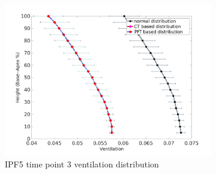 \begin{figure}[htbp]  
\centering
\begin{subfigure}{.6\linewidth}%
  \includegraphics[width=\linewidth,trim={{.0\wd0} {.0\wd0} {.0\wd0} {.0\wd0}},clip]{Appendix/Image_AppexB/IPF513/IPF513_VentilationAgainstLungHeight.png} %
  \caption{IPF5 time point 3 ventilation distribution}
  \label{fig:VQDistribution-a} 
\end{subfigure} 
\begin{subfigure}{.6\linewidth}%

\end{subfigure}
\end{figure}
